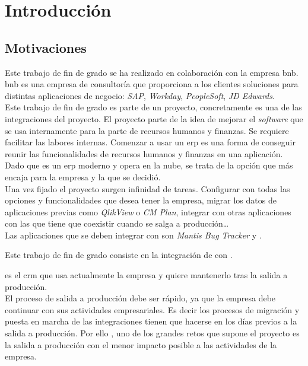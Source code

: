 \chapter{Introducción}


\section{Motivaciones}
Este trabajo de fin de grado se ha realizado en colaboración con la empresa \acrfull{bnb}.
\acrshort{bnb} es una empresa de consultoría que proporciona a los clientes soluciones para distintas aplicaciones de negocio: \textit{SAP}, \textit{Workday}, \textit{PeopleSoft}, \textit{JD Edwards}.\\

Este trabajo de fin de grado es parte de un proyecto, concretamente es una de las integraciones del proyecto.
El proyecto parte de la idea de mejorar el \textit{software} que se usa internamente para la parte de recursos humanos y finanzas. Se requiere facilitar las labores internas.
Comenzar a usar un \acrshort{erp} es una forma de conseguir reunir las funcionalidades de recursos humanos y finanzas en una aplicación.
Dado que \wday{} es un \acrshort{erp} moderno y opera en la nube, se trata de la opción que más encaja para la empresa y la que se decidió.
\\

Una vez fijado el proyecto surgen infinidad de tareas. Configurar \wday{} con todas las opciones y funcionalidades que desea tener la empresa, migrar los datos de aplicaciones previas como \textit{QlikView} o \textit{CM Plan}, 
integrar \wday{} con otras aplicaciones con las que tiene que coexistir cuando se salga a producción\ldots\\

Las aplicaciones que se deben integrar con \wday{} son \textit{Mantis Bug Tracker} y \hs{}.

Este trabajo de fin de grado consiste en la integración de \wday{} con \hs{}.

\hs{} es el \acrshort{crm} que usa actualmente la empresa y quiere mantenerlo tras la salida a producción.\\


El proceso de salida a producción debe ser rápido, ya que la empresa debe continuar con sus actividades empresariales. 
Es decir los procesos de migración y puesta en marcha de las integraciones tienen que hacerse en los días previos a la salida a producción.
Por ello , uno de los grandes retos que supone el proyecto es la salida a producción con el menor impacto posible a las actividades de la empresa.\\



